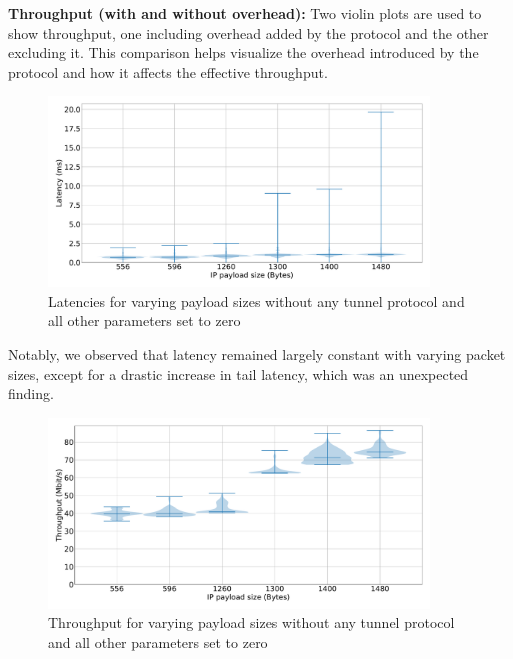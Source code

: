 \noindent\textbf{Throughput (with and without overhead):} Two violin plots are used to show throughput, one including overhead added by the protocol and the other excluding it.
This comparison helps visualize the overhead introduced by the protocol and how it affects the effective throughput.

\begin{figure}[tbh]
	\centering
	\includegraphics[draft=false,width=0.9\textwidth]{figures/Graphs/graph-4-mtu/latencies.pdf}
	\caption{Latencies for varying payload sizes without any tunnel protocol and all other parameters set to zero}
	\label{fig:graph-4-mtu-latencies}
\end{figure}

Notably, we observed that latency remained largely constant with varying packet sizes, except for a drastic increase in tail latency, which was an unexpected finding.

\begin{figure}[tbh]
	\centering
	\includegraphics[draft=false,width=0.9\textwidth]{figures/Graphs/graph-4-mtu/throughput.pdf}
	\caption{Throughput for varying payload sizes without any tunnel protocol and all other parameters set to zero}
	\label{fig:graph-4-mtu-throughput}
\end{figure}


